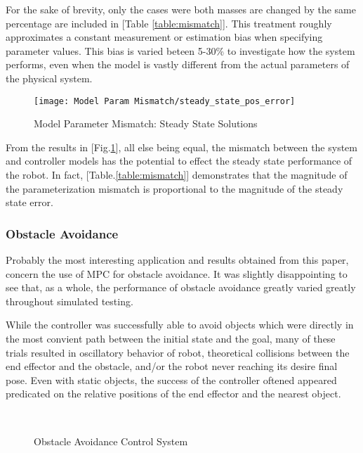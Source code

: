 \documentclass[journal]{IEEEtran}
\begin{document}
For the sake of brevity, only the cases were both masses are changed by the same percentage are included in [Table \ref{table:mismatch}]. This treatment roughly approximates a constant measurement or estimation bias when specifying parameter values. This bias is varied beteen 5-30\% to investigate how the system performs, even when the model is vastly different from the actual parameters of the physical system.

\begin{figure}[ht]%
    \centering
    \texttt{[image: Model Param Mismatch/steady\_state\_pos\_error]}
    \caption{Model Parameter Mismatch: Steady State Solutions}%
    \label{fig:model_param_mismatch}%
\end{figure}


From the results in [Fig.\ref{fig:model_param_mismatch}], all else being equal, the mismatch between the system and controller models has the potential to effect the steady state performance of the robot. In fact, [Table.\ref{table:mismatch}] demonstrates that the magnitude of the parameterization mismatch is proportional to the magnitude of the steady state error.\\

\subsubsection{Obstacle Avoidance}

Probably the most interesting application and results obtained from this paper, concern the use of MPC for obstacle avoidance. It was slightly disappointing to see that, as a whole, the performance of obstacle avoidance greatly varied greatly throughout simulated testing.

While the controller was successfully able to avoid objects which were directly in the most convient path between the initial state and the goal, many of these trials resulted in oscillatory behavior of robot, theoretical collisions between the end effector and the obstacle, and/or the robot never reaching its desire final pose. Even with static objects, the success of the controller oftened appeared predicated on the relative positions of the end effector and the nearest object. \\

\begin{figure}[ht]%
    \centering
    \qquad
    \\
    \qquad
    \caption{Obstacle Avoidance Control System}%
    \label{fig:obs_avoid_path}%
\end{figure}
\end{document}
